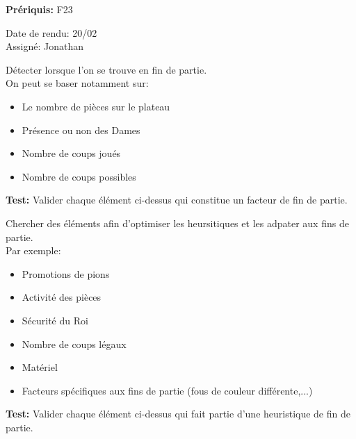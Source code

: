 \documentclass{article}
\begin{document}
\begin{needbox}
    
    \textbf{Prériquis:} F23
    \begin{duedatebox}
        Date de rendu: 20/02\\
        Assigné: Jonathan
    \end{duedatebox}
    \begin{subneedbox}
        Détecter lorsque l'on se trouve en fin de partie.\\
        On peut se baser notamment sur:
        \begin{itemize}
            \item Le nombre de pièces sur le plateau
            \item Présence ou non des Dames 
            \item Nombre de coups joués 
            \item Nombre de coups possibles
        \end{itemize}
        \textbf{Test:} Valider chaque élément ci-dessus qui constitue un facteur de fin de partie.
    \end{subneedbox}
    \begin{subneedbox}
        Chercher des éléments afin d'optimiser les heursitiques et les adpater aux fins de partie.\\
        Par exemple:
        \begin{itemize}
            \item Promotions de pions
            \item Activité des pièces
            \item Sécurité du Roi
            \item Nombre de coups légaux
            \item Matériel
            \item Facteurs spécifiques aux fins de partie (fous de couleur différente,...)
        \end{itemize}
        \textbf{Test:} Valider chaque élément ci-dessus qui fait partie d'une heuristique de fin de partie.
    \end{subneedbox}
\end{needbox}
\end{document}
